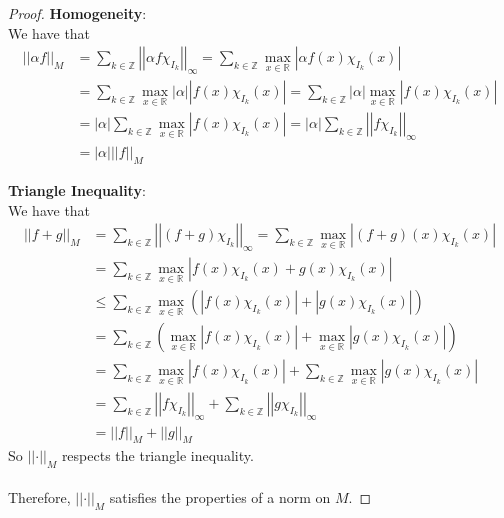 \documentclass{article}
\newcommand{\norm}[1]{\left|\left|#1\right|\right|}
\newcommand{\abs}[1]{\left|#1\right|}
\newcommand{\parens}[1]{\left(#1\right)}
\newcommand{\R}{\mathbb{R}}
\newcommand{\Z}{\mathbb{Z}}
\begin{document}
\begin{proof}
        \textbf{Homogeneity}:\\
        We have that 
        \begin{align*}
        \norm{\alpha f}_M &= \sum_{k\in\Z}\norm{\alpha f\chi_{I_k}}_\infty = 
        \sum_{k\in\Z}\max_{x\in \R}\abs{\alpha f(x)\chi_{I_k}(x)} \\
        &= \sum_{k\in\Z}\max_{x\in\R}\abs{\alpha}\abs{f(x)\chi_{I_k}(x)} =
        \sum_{k\in\Z}\abs{\alpha}\max_{x\in\R}\abs{f(x)\chi_{I_k}(x)} \\
        &= \abs{\alpha}\sum_{k\in\Z}\max_{x\in\R}\abs{f(x)\chi_{I_k}(x)} = 
        \abs{\alpha}\sum_{k\in\Z}\norm{f\chi_{I_k}}_\infty \\
        &= \abs{\alpha}\norm{f}_M
        \end{align*}

        \textbf{Triangle Inequality}:\\
        We have that
        \begin{align*}
        \norm{f+g}_M &= \sum_{k\in\Z}\norm{(f+g)\chi_{I_k}}_\infty = 
        \sum_{k\in\Z}\max_{x\in\R}\abs{(f+g)(x)\chi_{I_k}(x)} \\
        &= \sum_{k\in\Z}\max_{x\in\R}\abs{f(x)\chi_{I_k}(x) + g(x)\chi_{I_k}(x)} \\
        &\leq \sum_{k\in\Z}\max_{x\in\R}\parens{\abs{f(x)\chi_{I_k}(x)} + 
        \abs{g(x)\chi_{I_k}(x)}} \\
        &= \sum_{k\in\Z}\parens{\max_{x\in\R}\abs{f(x)\chi_{I_k}(x)} + 
        \max_{x\in\R}\abs{g(x)\chi_{I_k}(x)}} \\
        &= \sum_{k\in\Z}\max_{x\in\R}\abs{f(x)\chi_{I_k}(x)} + 
        \sum_{k\in\Z}\max_{x\in\R}\abs{g(x)\chi_{I_k}(x)} \\
        &= \sum_{k\in\Z}\norm{f\chi_{I_k}}_\infty + 
        \sum_{k\in\Z}\norm{g\chi_{I_k}}_\infty \\
        &= \norm{f}_M + \norm{g}_M
        \end{align*}
        So $\norm{\cdot}_M$ respects the triangle inequality.\\\\
        Therefore, $\norm{\cdot}_M$ satisfies the properties of a norm on $M$.
        \end{proof}
\end{document}
